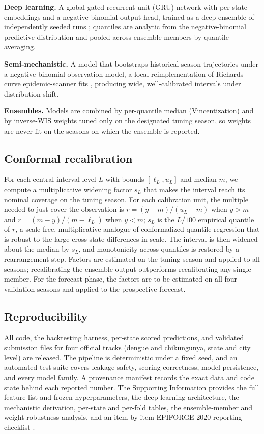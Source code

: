 \documentclass[11pt]{article}
\begin{document}
\noindent\textbf{Deep learning.} A global gated recurrent unit (GRU) network \citep{cho2014} with
per-state embeddings and a negative-binomial output head, trained as a deep ensemble of
independently seeded runs \citep{lakshminarayanan2017}; quantiles are analytic from the negative-binomial
predictive distribution and pooled across ensemble members by quantile averaging.

\noindent\textbf{Semi-mechanistic.} A model that bootstraps historical season trajectories under a
negative-binomial observation model, a local reimplementation of Richards-curve epidemic-scanner fits
\citep{richards1959}, producing wide, well-calibrated intervals under distribution shift.

\noindent\textbf{Ensembles.} Models are combined by per-quantile median (Vincentization) and by
inverse-WIS weights tuned only on the designated tuning season, so weights are never fit on the
seasons on which the ensemble is reported.

\subsection{Conformal recalibration}\label{sec:methods-conformal}
For each central interval level $L$ with bounds $[\ell_L,u_L]$ and median $m$, we compute a
multiplicative widening factor $s_L$ that makes the interval reach its nominal coverage on the tuning
season. For each calibration unit, the multiple needed to just cover the observation is
$r=(y-m)/(u_L-m)$ when $y>m$ and $r=(m-y)/(m-\ell_L)$ when $y<m$; $s_L$ is the $L/100$ empirical
quantile of $r$, a scale-free, multiplicative analogue of conformalized quantile regression that is
robust to the large cross-state differences in scale. The interval is then widened about the median
by $s_L$, and monotonicity across quantiles is restored by a rearrangement step. Factors are estimated
on the tuning season and applied to all seasons; recalibrating the ensemble output outperforms
recalibrating any single member. For the forecast phase, the factors are to be estimated on all four
validation seasons and applied to the prospective forecast.

\subsection{Reproducibility}
All code, the backtesting harness, per-state scored predictions, and validated submission files for
four official tracks (dengue and chikungunya, state and city level) are released. The pipeline is
deterministic under a fixed seed, and an automated test suite covers leakage safety, scoring
correctness, model persistence, and every model family. A provenance manifest records the exact data
and code state behind each reported number. The Supporting Information provides the full feature list
and frozen hyperparameters, the deep-learning architecture, the mechanistic derivation, per-state and
per-fold tables, the ensemble-member and weight robustness analysis, and an item-by-item EPIFORGE 2020
reporting checklist \citep{pollett2021}.
\end{document}
